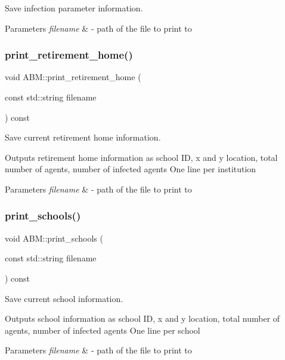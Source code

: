 Save infection parameter information. 


\begin{DoxyParams}{Parameters}
{\em filename} & -\/ path of the file to print to \\
\hline
\end{DoxyParams}
\mbox{\label{classABM_afaddfd46a69c396b8e9648041e014c86}} 
\subsubsection{\texorpdfstring{print\+\_\+retirement\+\_\+home()}{print\_retirement\_home()}}
{\footnotesize\ttfamily void A\+B\+M\+::print\+\_\+retirement\+\_\+home (\begin{DoxyParamCaption}\item[{const std\+::string}]{filename }\end{DoxyParamCaption}) const}



Save current retirement home information. 

Outputs retirement home information as school ID, x and y location, total number of agents, number of infected agents One line per institution 
\begin{DoxyParams}{Parameters}
{\em filename} & -\/ path of the file to print to \\
\hline
\end{DoxyParams}
\mbox{\label{classABM_a9363f01996ce065a1e3009f3c1d43126}} 
\subsubsection{\texorpdfstring{print\+\_\+schools()}{print\_schools()}}
{\footnotesize\ttfamily void A\+B\+M\+::print\+\_\+schools (\begin{DoxyParamCaption}\item[{const std\+::string}]{filename }\end{DoxyParamCaption}) const}



Save current school information. 

Outputs school information as school ID, x and y location, total number of agents, number of infected agents One line per school 
\begin{DoxyParams}{Parameters}
{\em filename} & -\/ path of the file to print to \\
\hline
\end{DoxyParams}
\mbox{\label{classABM_a72f37504297bcc5392f68e002c4bc380}} 
